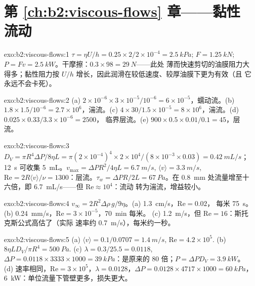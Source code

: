 \section*{第 \ref{ch:b2:viscous-flows} 章——黏性流动}

\begin{solution}{exo:b2:viscous-flows:1}
$\tau = \eta U/h = 0.25 \times 2/2 \times 10^{-4} = \qty{2.5}{kPa}$; $F = \qty{1.25}{kN}$;
$P = Fv = \qty{2.5}{kW}$。干摩擦：$0.3 \times 98 = \qty{29}{N}$——此处
薄而快速剪切的油膜阻力大得多；黏性阻力按
$U/h$ 增长，因此润滑在较低速度、较厚油膜下更为有效（且
它永远不会卡死）。
\end{solution}

\begin{solution}{exo:b2:viscous-flows:2}
(a) $2 \times 10^{-6} \times 3 \times 10^{-5}/10^{-6} = 6 \times 10^{-5}$，蠕动流。(b)
$1.8 \times 1.5/10^{-6} = 2.7 \times 10^6$，湍流。(c) $4 \times 30/1.5 \times 10^{-5}
= 8 \times 10^6$，湍流。(d) $0.025 \times 0.33/3.3 \times 10^{-6} = 2500$，
临界层流。(e) $900 \times 0.5 \times 0.01/0.1 = 45$，层流。
\end{solution}

\begin{solution}{exo:b2:viscous-flows:3}
$D_V = \pi R^4\Delta P/8\eta L = \pi(2 \times 10^{-4})^4 \times 2 \times 10^4/(8 \times 10^{-3}
\times 0.03) = \qty{0.42}{mL/s}$；\qty{12}{s} 可收集 \qty{5}{mL}。$v_{\max} = \Delta PR^2/
4\eta L = \qty{6.7}{m/s}$, $\langle v\rangle = \qty{3.3}{m/s}$, $\mathrm{Re} = 2R\langle v
\rangle/\nu = 1300$：层流。$\tau_w = \Delta PR/2L = \qty{67}{Pa}$。在
\qty{0.8}{mm} 处流量增至十六倍，即 \qty{6.7}{mL/s}——但 $\mathrm{Re} \approx 10^4$：流动
转为湍流，增益较小。
\end{solution}

\begin{solution}{exo:b2:viscous-flows:4}
$v_\infty = 2R^2\Delta\rho\,g/9\eta$。(a) \qty{1.3}{cm/s}，$\mathrm{Re} = 0.02$，
每米 \qty{75}{s}。(b) \qty{0.24}{mm/s}，$\mathrm{Re} = 3 \times 10^{-5}$，\qty{70}{min} 每米。
(c) \qty{1.2}{m/s}，但 $\mathrm{Re} = 16$：斯托克斯公式高估了（实际
速率约 \qty{0.7}{m/s}），每米约一秒。
\end{solution}

\begin{solution}{exo:b2:viscous-flows:5}
(a) $\langle v\rangle = 0.1/0.0707 = \qty{1.4}{m/s}$, $\mathrm{Re} = 4.2 \times 10^5$. (b)
$8\eta LD_V/\pi R^4 = \qty{500}{Pa}$. (c) $\lambda = 0.3/25.5 = 0.0118$, $\Delta P = 0.0118
\times 3333 \times 1000 = \qty{39}{kPa}$：是原来的 $80$ 倍；$P = \Delta PD_V = \qty{3.9}{kW}$。
(d) 速率相同，$\mathrm{Re} = 3 \times 10^5$，$\lambda = 0.0128$，$\Delta P = 0.0128 \times 4717
\times 1000 = \qty{60}{kPa}$，\qty{6}{kW}：单位流量下管壁更多，损失更大。
\end{solution}

